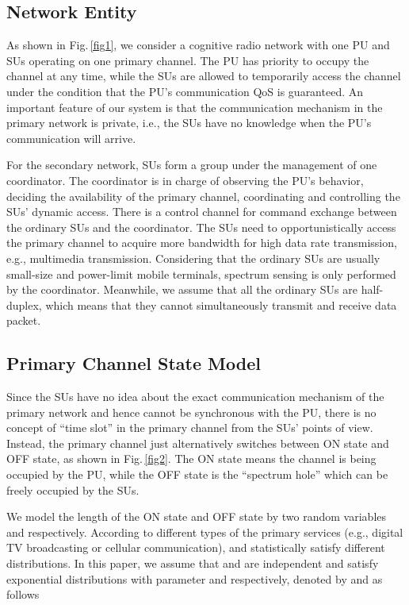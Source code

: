 \documentclass[11pt,draftcls]{IEEEtran}{\onecolumn}
\begin{document}
\subsection{Network Entity}

As shown in Fig.\,\ref{fig1}, we consider a cognitive radio network
with one PU and  SUs operating on one primary channel. The PU has
priority to occupy the channel at any time, while the SUs are
allowed to temporarily access the channel under the condition that
the PU's communication QoS is guaranteed. An important feature of
our system is that the communication mechanism in the primary
network is private, i.e., the SUs have no knowledge when the PU's
communication will arrive.

For the secondary network,  SUs form a group under the management
of one coordinator. The coordinator is in charge of observing the
PU's behavior, deciding the availability of the primary channel,
coordinating and controlling the SUs' dynamic access. There is a
control channel for command exchange between the ordinary SUs
and the coordinator. The SUs need to opportunistically access the primary
channel to acquire more bandwidth for high data rate transmission,
e.g., multimedia transmission. Considering that the ordinary SUs are
usually small-size and power-limit mobile terminals, spectrum
sensing is only performed by the coordinator. Meanwhile, we assume
that all the ordinary SUs are half-duplex, which means that they
cannot simultaneously transmit and receive data packet.

\subsection{Primary Channel State Model}\label{ONOFF}

Since the SUs have no idea about the exact communication mechanism
of the primary network and hence cannot be synchronous with the PU,
there is no concept of ``time slot'' in the primary channel from the
SUs' points of view. Instead, the primary channel just alternatively
switches between ON state and OFF state, as shown in
Fig.\,\ref{fig2}. The ON state means the channel is being occupied
by the PU, while the OFF state is the ``spectrum hole'' which can be
freely occupied by the SUs.

We model the length of the ON state and OFF state by two random
variables  and 
respectively. According to different types of the primary services
(e.g., digital TV broadcasting or cellular communication),
 and  statistically
satisfy different distributions. In this paper, we assume that
 and  are independent
and satisfy exponential distributions with parameter  and
 respectively, denoted by  and
 as follows
\end{document}
